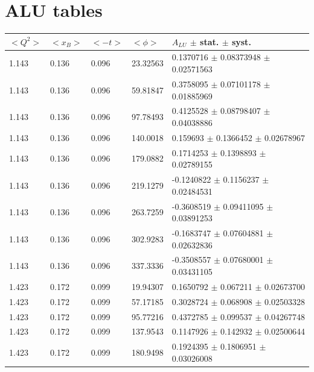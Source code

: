 \newpage
\newpage
\newpage
\newpage
\newpage
\section*{ALU tables}
\begin{table}[!h]
   \begin{center}
      \begin{tabular}{||l|l|l|l|l||}
         \hline
 $<Q^{2}>$ & $<x_{B}>$ & $<-t>$ & $<\phi>$ & $A_{LU}$ $\pm$ stat. $\pm$ syst.\\
         \hline
         1.143 & 0.136 & 0.096 &  23.32563   &    0.1370716  $\pm$   0.08373948  $\pm$   0.02571563 \\
         1.143 & 0.136 & 0.096 &  59.81847   &    0.3758095  $\pm$   0.07101178  $\pm$   0.01885969 \\
         1.143 & 0.136 & 0.096 &  97.78493   &    0.4125528  $\pm$   0.08798407  $\pm$   0.04038886 \\
         1.143 & 0.136 & 0.096 &  140.0018   &    0.159693   $\pm$   0.1366452   $\pm$   0.02678967 \\
         1.143 & 0.136 & 0.096 &  179.0882   &    0.1714253  $\pm$   0.1398893   $\pm$   0.02789155 \\
         1.143 & 0.136 & 0.096 &  219.1279   &   -0.1240822  $\pm$   0.1156237   $\pm$   0.02484531 \\
         1.143 & 0.136 & 0.096 &  263.7259   &   -0.3608519  $\pm$   0.09411095  $\pm$   0.03891253 \\
         1.143 & 0.136 & 0.096 &  302.9283   &   -0.1683747  $\pm$   0.07604881  $\pm$   0.02632836 \\
         1.143 & 0.136 & 0.096 &  337.3336   &   -0.3508557  $\pm$   0.07680001  $\pm$   0.03431105 \\
         \hline                                                                          
         1.423 & 0.172 & 0.099 &  19.94307   &    0.1650792  $\pm$   0.067211    $\pm$   0.02673700 \\
         1.423 & 0.172 & 0.099 &  57.17185   &    0.3028724  $\pm$   0.068908    $\pm$   0.02503328 \\
         1.423 & 0.172 & 0.099 &  95.77216   &    0.4372785  $\pm$   0.099537    $\pm$   0.04267748 \\
         1.423 & 0.172 & 0.099 &  137.9543   &    0.1147926  $\pm$   0.142932    $\pm$   0.02500644 \\
         1.423 & 0.172 & 0.099 &  180.9498   &    0.1924395  $\pm$   0.1806951   $\pm$   0.03026008 \\

\end{tabular}
\end{center}
\end{table}
